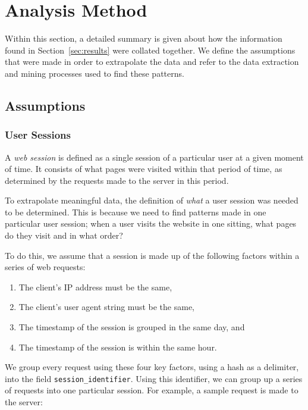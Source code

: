 \section{Analysis Method}
\label{sec:method}

Within this section, a detailed summary is given about how the information found in Section~\ref{sec:results} were collated together. We define the assumptions that were made in order to extrapolate the data and refer to the data extraction and mining processes used to find these patterns.

\subsection{Assumptions}
\label{sec:method:assumptions}

\subsubsection{User Sessions}
\label{sec:method:assumptions:user_sessions}

A \textit{web session} is defined as a single session of a particular user at a given moment of time. It consists of what pages were visited within that period of time, as determined by the requests made to the server in this period.

To extrapolate meaningful data, the definition of \textit{what} a user session was needed to be determined. This is because we need to find patterns made in one particular user session; when a user visits the website in one sitting, what pages do they visit and in what order?

To do this, we assume that a session is made up of the following factors within a series of web requests:

\begin{enumerate}
  \item The client's IP address must be the same,
  \item The client's user agent string must be the same,
  \item The timestamp of the session is grouped in the same day, and
  \item The timestamp of the session is within the same hour.
\end{enumerate}

We group every request using these four key factors, using a hash as a delimiter, into the field \texttt{session\_identifier}. Using this identifier, we can group up a series of requests into one particular session. For example, a sample request is made to the server:

